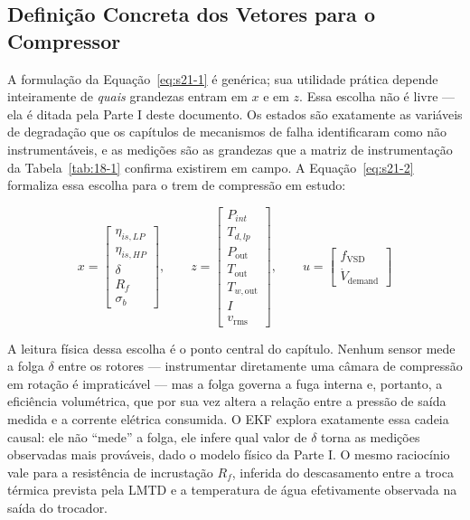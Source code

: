 \documentclass[12pt,a4paper]{article}
\numberwithin{equation}{section}
\numberwithin{table}{section}
\numberwithin{figure}{section}
\begin{document}
	\subsection{Definição Concreta dos Vetores para o Compressor}

	A formulação da Equação~\eqref{eq:s21-1} é genérica; sua utilidade prática depende inteiramente de \textit{quais} grandezas entram em $x$ e em $z$. Essa escolha não é livre — ela é ditada pela Parte I deste documento. Os estados são exatamente as variáveis de degradação que os capítulos de mecanismos de falha identificaram como não instrumentáveis, e as medições são as grandezas que a matriz de instrumentação da Tabela~\ref{tab:18-1} confirma existirem em campo. A Equação~\eqref{eq:s21-2} formaliza essa escolha para o trem de compressão em estudo:

	\begin{equation}\label{eq:s21-2}
	x = \begin{bmatrix} \eta_{is,LP} \\ \eta_{is,HP} \\ \delta \\ R_f \\ \sigma_b \end{bmatrix}, \qquad
	z = \begin{bmatrix} P_{int} \\ T_{d,lp} \\ P_{\text{out}} \\ T_{\text{out}} \\ T_{w,\text{out}} \\ I \\ v_{\text{rms}} \end{bmatrix}, \qquad
	u = \begin{bmatrix} f_{\text{VSD}} \\ \dot{V}_{\text{demand}} \end{bmatrix}
\end{equation}

	A leitura física dessa escolha é o ponto central do capítulo. Nenhum sensor mede a folga $\delta$ entre os rotores — instrumentar diretamente uma câmara de compressão em rotação é impraticável — mas a folga governa a fuga interna e, portanto, a eficiência volumétrica, que por sua vez altera a relação entre a pressão de saída medida e a corrente elétrica consumida. O EKF explora exatamente essa cadeia causal: ele não ``mede'' a folga, ele infere qual valor de $\delta$ torna as medições observadas mais prováveis, dado o modelo físico da Parte I. O mesmo raciocínio vale para a resistência de incrustação $R_f$, inferida do descasamento entre a troca térmica prevista pela LMTD e a temperatura de água efetivamente observada na saída do trocador.
\end{document}
